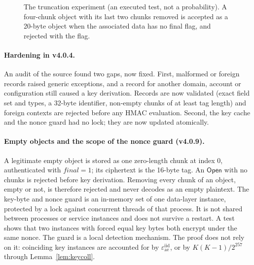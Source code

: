\documentclass[pdflatex,sn-mathphys-num,twocolumn]{sn-jnl}
\theoremstyle{plain}
\theoremstyle{definition}
\begin{document}
\begin{figure}[t]
\centering
\resizebox{\linewidth}{!}{}
\caption{The truncation experiment (an executed test, not a probability). A four-chunk object with its last two chunks removed is accepted as a 20-byte object when the associated data has no final flag, and rejected with the flag.}\label{fig:truncation}
\end{figure}

\paragraph{Hardening in v4.0.4.}
An audit of the source found two gaps, now fixed. First, malformed or foreign records raised generic exceptions, and a record for another domain, account or configuration still caused a key derivation. Records are now validated (exact field set and types, a 32-byte identifier, non-empty chunks of at least tag length) and foreign contexts are rejected before any HMAC evaluation. Second, the key cache and the nonce guard had no lock; they are now updated atomically.

\paragraph{Empty objects and the scope of the nonce guard (v4.0.9).}
A legitimate empty object is stored as one zero-length chunk at index $0$, authenticated with $\mathit{final}=1$; its ciphertext is the 16-byte tag. An $\mathsf{Open}$ with no chunks is rejected before key derivation. Removing every chunk of an object, empty or not, is therefore rejected and never decodes as an empty plaintext. The key-byte and nonce guard is an in-memory set of one data-layer instance, protected by a lock against concurrent threads of that process. It is not shared between processes or service instances and does not survive a restart. A test shows that two instances with forced equal key bytes both encrypt under the same nonce. The guard is a local detection mechanism. The proof does not rely on it: coinciding key instances are accounted for by $\varepsilon^{\mathrm{iid}}_{\mathrm{ae}}$, or by $K(K-1)/2^{257}$ through Lemma~\ref{lem:keycoll}.
\end{document}
